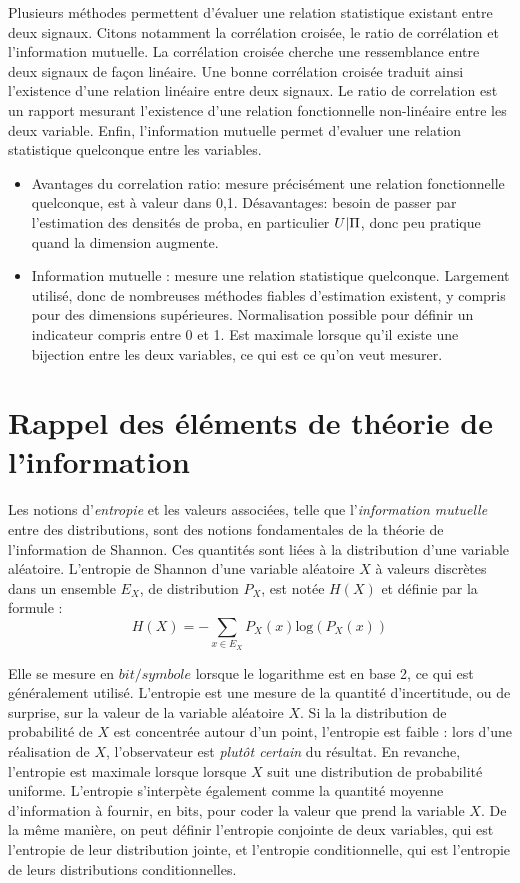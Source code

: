 \documentclass[../main]{subfiles}
\begin{document}
Plusieurs méthodes permettent d'évaluer une relation statistique existant entre deux signaux. Citons notamment la corrélation croisée, le ratio de corrélation et l'information mutuelle.
La corrélation croisée cherche une ressemblance entre deux signaux de façon linéaire. Une bonne corrélation croisée traduit ainsi l'existence d'une relation linéaire entre deux signaux.
Le ratio de correlation est un rapport mesurant l'existence d'une relation fonctionnelle non-linéaire entre les deux variable. 
Enfin, l'information mutuelle permet d'evaluer une relation statistique quelconque entre les variables.

\begin{itemize}
    \item Avantages du correlation ratio: mesure précisément une relation fonctionnelle quelconque, est à valeur dans 0,1. Désavantages: besoin de passer par l'estimation des densités de proba, en particulier $U|\Pi$, donc peu pratique quand la dimension augmente.
    \item Information mutuelle : mesure une relation statistique quelconque. Largement utilisé, donc de nombreuses méthodes fiables d'estimation existent, y compris pour des dimensions supérieures. Normalisation possible pour définir un indicateur compris entre 0 et 1. Est maximale lorsque qu'il existe une bijection entre les deux variables, ce qui est ce qu'on veut mesurer.
\end{itemize}

\section{Rappel des éléments de théorie de l'information}

Les notions d'\emph{entropie} et les valeurs associées, telle que l'\emph{information mutuelle} entre des distributions, sont des notions fondamentales de la théorie de l'information de Shannon. Ces quantités sont liées à la distribution d'une variable aléatoire.
L'entropie de Shannon d'une variable aléatoire $X$ à valeurs discrètes dans un ensemble $E_X$, de distribution $P_X$, est notée $H(X)$ et définie par la formule : 
\begin{equation}
H(X) = - \sum_{x \in E_X}{P_X(x)\textrm{log}(P_X(x))}
\end{equation}

Elle se mesure en $bit/symbole$ lorsque le logarithme est en base 2, ce qui est généralement utilisé. 
L'entropie est une mesure de la quantité d'incertitude, ou de surprise, sur la valeur de la variable aléatoire $X$. Si la la distribution de probabilité de $X$ est concentrée autour d'un point, l'entropie est faible : lors d'une réalisation de $X$, l'observateur est \emph{plutôt certain} du résultat. En revanche, l'entropie est maximale lorsque lorsque $X$ suit une distribution de probabilité uniforme.
L'entropie s'interpète également comme la quantité moyenne d'information à fournir, en bits, pour coder la valeur que prend la variable $X$.
De la même manière, on peut définir l'entropie conjointe de deux variables, qui est l'entropie de leur distribution jointe, et l'entropie conditionnelle, qui est l'entropie de leurs distributions conditionnelles.
\end{document}
